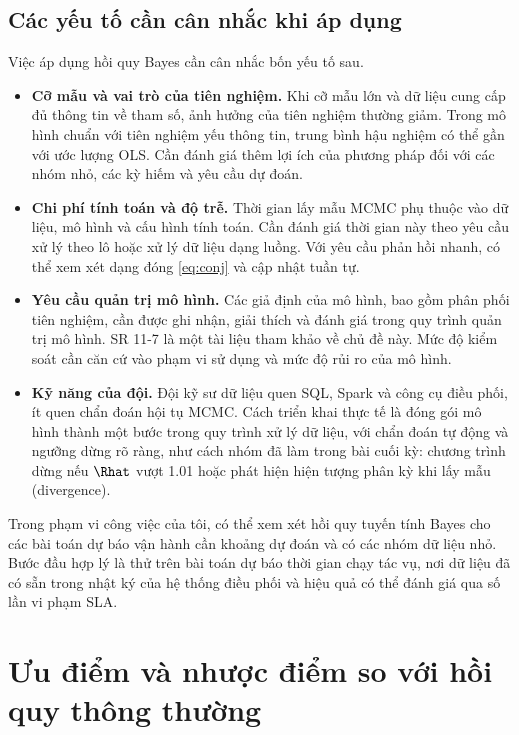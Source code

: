 \documentclass[12pt,a4paper]{report}
\begin{document}
\section{Các yếu tố cần cân nhắc khi áp dụng}

Việc áp dụng hồi quy Bayes cần cân nhắc bốn yếu tố sau.

\begin{itemize}
  \item \textbf{Cỡ mẫu và vai trò của tiên nghiệm.} Khi cỡ mẫu lớn và dữ liệu cung cấp
    đủ thông tin về tham số, ảnh hưởng của tiên nghiệm thường giảm. Trong mô
    hình chuẩn với tiên nghiệm yếu thông tin, trung bình hậu nghiệm có thể gần
    với ước lượng OLS. Cần đánh giá thêm lợi ích của phương pháp đối với các
    nhóm nhỏ, các kỳ hiếm và yêu cầu dự đoán.
  \item \textbf{Chi phí tính toán và độ trễ.} Thời gian lấy mẫu MCMC phụ thuộc vào
    dữ liệu, mô hình và cấu hình tính toán. Cần đánh giá thời gian này theo yêu
    cầu xử lý theo lô hoặc xử lý dữ liệu dạng luồng. Với yêu cầu phản hồi nhanh,
    có thể xem xét
    dạng đóng \eqref{eq:conj} và cập nhật tuần tự.
  \item \textbf{Yêu cầu quản trị mô hình.} Các giả định của mô hình, bao gồm phân
    phối tiên nghiệm, cần được ghi nhận, giải thích và đánh giá trong quy trình
    quản trị mô hình. SR 11-7 \cite{fed2011sr117} là một tài liệu tham khảo
    về chủ đề này. Mức độ kiểm soát cần căn cứ vào phạm vi sử dụng và mức độ
    rủi ro của mô hình.
  \item \textbf{Kỹ năng của đội.} Đội kỹ sư dữ liệu quen SQL, Spark và công cụ điều
    phối, ít quen chẩn đoán hội tụ MCMC. Cách triển khai thực tế là đóng gói mô
    hình thành một bước trong quy trình xử lý dữ liệu, với chẩn đoán tự động và ngưỡng dừng rõ
    ràng, như cách nhóm đã làm trong bài cuối kỳ: chương trình dừng nếu $\Rhat$ vượt
    \num{1.01} hoặc phát hiện hiện tượng phân kỳ khi lấy mẫu (divergence).
\end{itemize}

Trong phạm vi công việc của tôi, có thể xem xét hồi quy tuyến tính Bayes cho các bài toán dự báo vận hành cần khoảng dự đoán và có các nhóm
dữ liệu nhỏ. Bước đầu hợp lý là thử trên bài toán dự báo thời gian chạy tác vụ, nơi
dữ liệu đã có sẵn trong nhật ký của hệ thống điều phối và hiệu quả có thể đánh giá qua
số lần vi phạm SLA.

\chapter{Ưu điểm và nhược điểm so với hồi quy thông thường}
\label{sec:compare}
\end{document}
